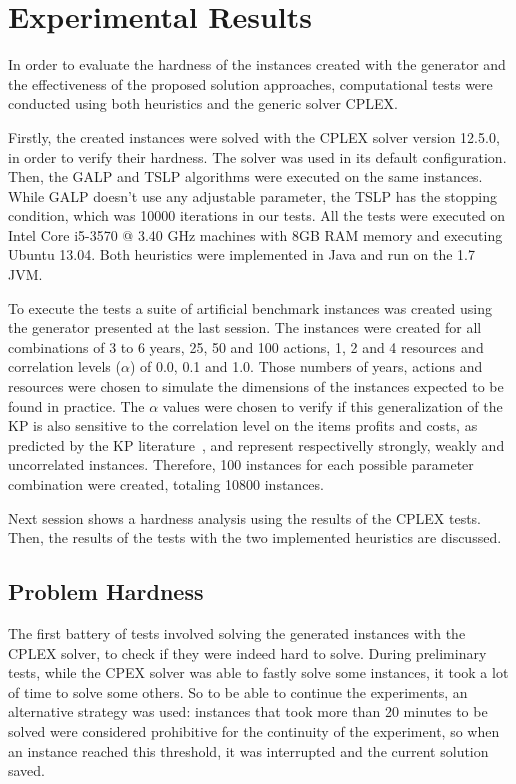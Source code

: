 \section{Experimental Results}
\label{sec:exp_results}

In order to evaluate the hardness of the instances created with the generator and the effectiveness of the proposed
solution approaches, computational tests were conducted using both heuristics and the generic solver CPLEX.

Firstly, the created instances were solved with the CPLEX solver version 12.5.0, in order to verify their hardness. 
The solver was used in its default configuration. Then, the GALP and TSLP algorithms were executed on the same instances.
While GALP doesn't use any adjustable parameter, the TSLP has the stopping condition, which was 10000 iterations in our
tests. All the tests were executed on Intel Core i5-3570 @ 3.40 GHz machines with 8GB RAM memory and executing Ubuntu 13.04.
Both heuristics were implemented in Java and run on the 1.7 JVM.

To execute the tests a suite of artificial benchmark instances was created using the generator presented at the last session.
The instances were created for all combinations of 3 to 6 years, 25, 50 and 100 actions, 1, 2 and 4 resources and
correlation levels ($\alpha$) of 0.0, 0.1 and 1.0. Those numbers of years, actions and resources were chosen to simulate 
the dimensions of the instances expected to be found in practice. The $\alpha$ values were chosen to verify if this 
generalization of the KP is also sensitive to the correlation level on the items profits and costs, as predicted
by the KP literature~\cite{pisinger2005}, and represent respectivelly strongly, weakly and uncorrelated instances. Therefore, 100 instances 
for each possible parameter combination were created, totaling 10800 instances.

Next session shows a hardness analysis using the results of the CPLEX tests. Then, the results of the tests with
the two implemented heuristics are discussed.

\subsection{Problem Hardness}

The first battery of tests involved solving the generated instances with the CPLEX solver, to check if they were
indeed hard to solve. During preliminary tests, while the CPEX solver was able to fastly solve some instances, it took 
a lot of time to solve some others. So to be able to continue the experiments, an alternative strategy was used: instances
that took more than 20 minutes to be solved were considered prohibitive for the continuity of the experiment, so when an 
instance reached this threshold, it was interrupted and the current solution saved.

